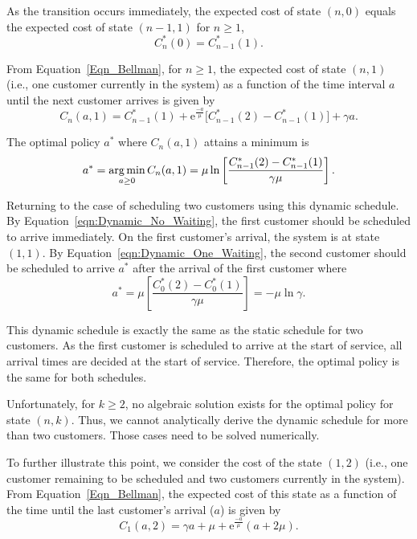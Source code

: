 As the transition occurs immediately, the expected cost of state $(n, 0)$ equals the expected cost of state $(n - 1, 1)$ for $n \geq 1$,
\begin{equation}
	C_{n}^{*} (0) = C_{n - 1}^{*} (1).
\end{equation}

From Equation~\ref{Eqn_Bellman}, for $n \geq 1$, the expected cost of state $(n, 1)$ (i.e., one customer currently in the system) as a function of the time interval $a$ until the next customer arrives is given by
\begin{equation}
	C_{n} (a, 1) = C_{n - 1}^{*} (1) + \mathrm{e}^{\frac{-a}{\mu}} \Big[ C_{n - 1}^{*} (2) - C_{n - 1}^{*} (1) \Big] + \gamma a.
\end{equation}

The optimal policy $a^{*}$ where $C_{n} (a, 1)$ attains a minimum is
\begin{equation}
	a^{*} = \operatorname*{arg\,min}_{a \geq 0} C_{n} (a, 1) = \mu \ln \left[ \frac{C_{n - 1}^{*} (2) - C_{n - 1}^{*} (1)}{\gamma \mu} \right].
	\label{eqn:Dynamic_One_Waiting}
\end{equation}

Returning to the case of scheduling two customers using this dynamic schedule. By Equation~\ref{eqn:Dynamic_No_Waiting}, the first customer should be scheduled to arrive immediately. On the first customer's arrival, the system is at state $(1, 1)$. By Equation~\ref{eqn:Dynamic_One_Waiting}, the second customer should be scheduled to arrive $a^{*}$ after the arrival of the first customer where
\begin{equation}
	a^{*} = \mu \left[ \frac{C_{0}^{*} (2) - C_{0}^{*} (1)}{\gamma \mu} \right] = - \mu \ln \gamma.
\end{equation}

This dynamic schedule is exactly the same as the static schedule for two customers. As the first customer is scheduled to arrive at the start of service, all arrival times are decided at the start of service. Therefore, the optimal policy is the same for both schedules.

Unfortunately, for $k \geq 2$, no algebraic solution exists for the optimal policy for state $(n, k)$. Thus, we cannot analytically derive the dynamic schedule for more than two customers. Those cases need to be solved numerically.

To further illustrate this point, we consider the cost of the state $(1, 2)$ (i.e., one customer remaining to be scheduled and two customers currently in the system). From Equation~\ref{Eqn_Bellman}, the expected cost of this state as a function of the time until the last customer's arrival ($a$) is given by
\begin{equation}
	C_{1} (a, 2) = \gamma a + \mu + \mathrm{e}^{\frac{-a}{\mu}} (a + 2 \mu).
\end{equation}

